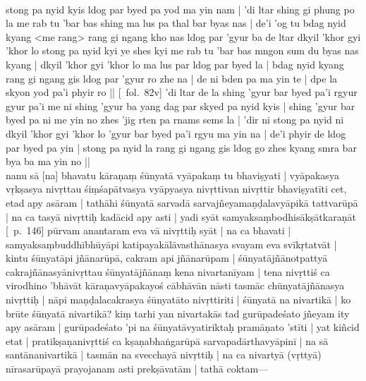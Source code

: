 \documentclass[12pt]{article}
\newcommand{\emdash} {\hspace{0em}—\hspace{0em}}
\begin{document}
\textbf{\TVB}\\
stong pa nyid kyis ldog par byed pa yod ma yin nam | 'di ltar shing gi phung po la me rab tu 'bar bas shing ma lus pa thal bar byas nas | de'i 'og tu bdag nyid kyang <me rang> rang gi ngang kho nas ldog par 'gyur ba de ltar dkyil 'khor gyi 'khor lo stong pa nyid kyi ye shes kyi me rab tu 'bar bas mngon sum du byas nas kyang | dkyil 'khor gyi 'khor lo ma lus par ldog par byed la | bdag nyid kyang rang gi ngang gis ldog par 'gyur ro zhe na | de ni bden pa ma yin te | dpe la skyon yod pa'i phyir ro || [\TVB\ fol.\ 82v] 'di ltar de la shing 'gyur bar byed pa'i rgyur gyur pa'i me ni shing 'gyur ba yang dag par skyed pa nyid kyis | shing 'gyur bar byed pa ni me yin no zhes 'jig rten pa rnams sems la | 'dir ni stong pa nyid ni dkyil 'khor gyi 'khor lo 'gyur bar byed pa'i rgyu ma yin na | de'i phyir de ldog par byed pa yin | stong pa nyid la rang gi ngang gis ldog go zhes kyang smra bar bya ba ma yin no || \\

nanu sā [na] bhavatu kāraṇaṃ śūnyatā vyāpakaṃ tu bhaviṣyati | vyāpakasya vṛkṣasya nivṛttau śiṃśapātvasya vyāpyasya nivṛttivan nivṛttir bhaviṣyatīti cet, etad apy asāram | tathāhi śūnyatā sarvadā sarvajñeyamaṇḍalavyāpikā tattvarūpā | na ca tasyā nivṛttiḥ kadācid apy asti | yadi syāt samyaksaṃbodhisākṣātkaraṇāt [\EDD\ p.\ 146] pūrvam anantaram eva vā nivṛttiḥ syāt | na ca bhavati | samyaksaṃbuddhībhūyāpi katipayakālāvasthānasya svayam eva svīkṛtatvāt | kintu śūnyatāpi jñānarūpā, cakram api jñānarūpam | śūnyatājñānotpattyā cakrajñānasyānivṛttau śūnyatājñānaṃ kena nivartanīyam | tena nivṛttiś ca virodhino 'bhāvāt kāraṇavyāpakayoś cābhāvān nāsti tasmāc chūnyatājñānasya nivṛttiḥ | nāpi maṇḍalacakrasya śūnyatāto nivṛttiriti | śūnyatā na nivartikā | ko brūte śūnyatā nivartikā? kiṃ tarhi yan nivartakās tad gurūpadeśato jñeyam ity apy asāram | gurūpadeśato 'pi na śūnyatāvyatiriktaḥ pramāṇato 'stīti | yat kiñcid etat | pratikṣaṇanivṛttiś ca kṣaṇabhaṅgarūpā sarvapadārthavyāpinī | na sā santānanivartikā | tasmān na svecchayā nivṛttiḥ | na ca nivartyā (vṛttyā) nīrasarūpayā prayojanam asti prekṣāvatām | tathā coktam\emdash \\
\end{document}
